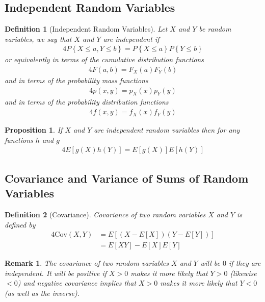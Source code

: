 \documentclass[11pt, oneside]{book}   	%
\newtheorem{definition}{Definition}[chapter]
\newtheorem{remark}{Remark}[chapter]
\newtheorem{proposition}{Proposition}[chapter]
\newcommand{\set}[1]{\left\{#1\right\}}
\newcommand{\cov}[1]{\mathrm{Cov}\left(#1\right)}
\begin{document}
\subsection{Independent Random Variables}

\begin{definition}[Independent Random Variables]
	Let $X$ and $Y$ be random variables, we say that $X$ and $Y$ are independent if 
	\begin{alignat}{4}
		P\set{X\leq a, Y\leq b}=P\set{X\leq a}P\set{Y\leq b}
	\end{alignat}
	or equivalently in terms of the cumulative distribution functions 
	\begin{alignat}{4}
		F(a, b)=F_X(a)F_Y(b)
	\end{alignat}
	and in terms of the probability mass functions 
	\begin{alignat}{4}
		p(x, y)=p_X(x)p_Y(y)
	\end{alignat}
	and in terms of the probability distribution functions 
	\begin{alignat}{4}
		f(x, y)=f_X(x)f_Y(y)
	\end{alignat}
\end{definition}

\begin{proposition}
	If $X$ and $Y$ are independent random variables then for any functions $h$ and $g$
	\begin{alignat}{4}
		E[g(X)h(Y)]=E[g(X)]E[h(Y)]
	\end{alignat}
\end{proposition}

\subsection{Covariance and Variance of Sums of Random Variables}

\begin{definition}[Covariance]
	Covariance of two random variables $X$ and $Y$ is defined by 
	\begin{alignat}{4}
		\cov{X, Y}&=E[(X-E[X])(Y-E[Y])] \\
			&=E[XY]-E[X]E[Y]
	\end{alignat}
\end{definition}

\begin{remark}
	The covariance of two random variables $X$ and $Y$ will be $0$ if they are independent. It will be positive if $X>0$ makes it more likely that $Y>0$ (likewise $<0$) and negative covariance implies that $X>0$ makes it more likely that $Y<0$ (as well as the inverse). 
\end{remark}
\end{document}
